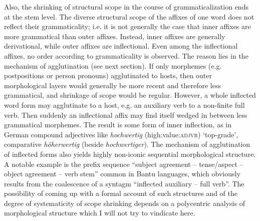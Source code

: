 Also, the shrinking of structural scope in the course of grammaticalization ends at the stem level. The diverse structural scope of the affixes of one word does not reflect their grammaticality; i.e. it is not generally the case that inner affixes are more grammatical than outer affixes. Instead, inner affixes are generally derivational, while outer affixes are inflectional. Even among the inflectional affixes, no order according to grammaticality is observed. The reason lies in the mechanism of agglutination (see next section). If only morphemes (e.g. postpositions or person pronouns) agglutinated to hosts, then outer morphological layers would generally be more recent and therefore less grammatical, and shrinkage of scope would be regular. However, a whole inflected word form may agglutinate to a host, e.g. an auxiliary verb to a non-finite full verb. Then suddenly an inflectional affix may find itself wedged in between less grammatical morphemes. The result is some form of inner inflection, as in German compound adjectives like \textit{hochwertig} (high:value:\textsc{adjvr}) ‘top-grade’, comparative \textit{höherwertig} (beside \textit{hochwertiger}). The mechanism of agglutination of inflected forms also yields highly non-iconic sequential morphological structure. A notable example is the prefix sequence ``subject agreement -- tense/aspect -- object agreement -- verb stem'' common in Bantu languages, which obviously results from the coalescence of a syntagm ``inflected auxiliary -- full verb''. The possibility of coming up with a formal account of such structures and of the degree of systematicity of scope shrinking depends on a polycentric analysis of morphological structure which I will not try to vindicate here.

